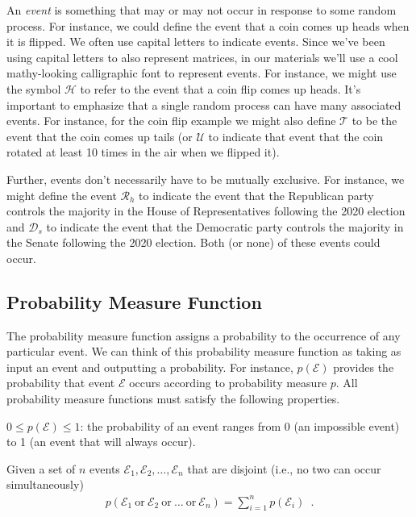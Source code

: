 \documentclass[assignment01_Solutions]{subfiles}
\begin{document}
An \emph{event} is something that may or may not occur in response to some random process.  For instance, we could define the event that a coin comes up heads when it is flipped.  We often use capital letters to indicate events.  Since we've been using capital letters to also represent matrices, in our materials we'll use a cool mathy-looking calligraphic font to represent events.  For instance, we might use the symbol $\mathcal{H}$ to refer to the event that a coin flip comes up heads. It's important to emphasize that a single random process can have many associated events.   For instance, for the coin flip example we might also define $\mathcal{T}$ to be the event that the coin comes up tails (or $\mathcal{U}$ to indicate that event that the coin rotated at least 10 times in the air when we flipped it).

Further, events don't necessarily have to be mutually exclusive.  For instance, we might define the event $\mathcal{R}_h$ to indicate the event that the Republican party controls the majority in the House of Representatives following the 2020 election and $\mathcal{D}_s$ to indicate the event that the Democratic party controls the majority in the Senate following the 2020 election.  Both (or none) of these events could occur.

\subsection{Probability Measure Function}
The probability measure function assigns a probability to the occurrence of any particular event.  We can think of this probability measure function as taking as input an event and outputting a probability.  For instance, $p(\mathcal{E})$ provides the probability that event $\mathcal{E}$ occurs according to probability measure $p$.  All probability measure functions must satisfy the following properties.

\bi
\item $0 \leq p(\mathcal{E}) \leq 1$: the probability of an event ranges from 0 (an impossible event) to 1 (an event that will always occur).
\item Given a set of $n$ events $\mathcal{E}_1, \mathcal{E}_2, \ldots, \mathcal{E}_n$ that are disjoint (i.e., no two can occur simultaneously)
\begin{align}
p(\mathcal{E}_1~\mbox{or}~\mathcal{E}_2~\mbox{or}~\ldots~\mbox{or}~\mathcal{E}_n) = \sum_{i=1}^n p(\mathcal{E}_i) \label{eq:probunion} \enspace .
\end{align}
\end{document}
